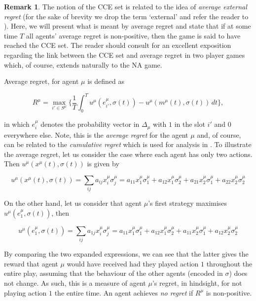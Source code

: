 \documentclass{article}
\theoremstyle{definition}
\newtheorem*{remark}{Remark}
\newcommand{\pure}[2]{e^{#1}_{#2}}
\begin{document}
  \begin{remark}
    The notion of the CCE set is related to the idea of \emph{average external regret} (for the
    sake of brevity we drop the term `external' and refer the reader to \cite{AGT}). Here, we
    will present what is meant by average regret and state that if at some time $T$ all agents'
    average regret is non-positive, then the game is said to have reached the CCE set. The
    reader should consult \cite{PayoffPerformance} for an excellent exposition regarding the
    link between the CCE set and average regret in two player games which, of course, extends
    naturally to the NA game.
    
    Average regret, for agent $\mu$ is defined as

    \begin{equation}
      R^{\mu} = \max_{i' \in S^\mu} \Big\{ \frac{1}{T} \int_{0}^{T} u^{\mu}(\pure{\mu}{i'}, \sigma(t)) - u^{\mu}(m^\mu(t), \sigma(t)) \, dt \Big\},
    \end{equation}
  
    in which $\pure{\mu}{i}$ denotes the probability vector in $\Delta_\mu$ with $1$ in the slot
    $i'$ and $0$ everywhere else. Note, this is the \emph{average regret} for the agent $\mu$
    and, of course, can be related to the \emph{cumulative regret} which is used for analysis
    in \cite{Leonardos and Piliouras, Cesa-Bianchi}.  To illustrate the average regret, let us
    consider the case where each agent has only two actions. Then $u^{\mu}(x^\mu(t), \sigma(t))$
    is given by
    
    \begin{equation}
      u^{\mu}(x^\mu(t), \sigma(t)) = \sum_{ij} a_{ij} x_i^\mu \sigma_j^\mu = a_{11} x_1^\mu \sigma_1^\mu + a_{12} x_1^\mu \sigma_2^\mu + a_{21} x_2^\mu \sigma_1^\mu + a_{22} x_2^\mu \sigma_2^\mu
    \end{equation}
  
    On the other hand, let us consider that agent $\mu$'s first strategy maximises $u^{\mu}(\pure{\mu}{1}, \sigma(t))$, then
  
    \begin{equation}
      u^{\mu}(\pure{\mu}{1}, \sigma(t)) = \sum_{ij} a_{1j} x_i^\mu \sigma_j^\mu = a_{11} x_1^\mu \sigma_1^\mu + a_{12} x_1^\mu \sigma_2^\mu + a_{11} x_2^\mu \sigma_1^\mu + a_{12} x_2^\mu \sigma_2^\mu 
    \end{equation}
  
    By comparing the two expanded expressions, we can see that the latter gives the reward that agent $\mu$ would have received had they played action $1$ throughout the entire play, assuming that the behaviour of the other agents (encoded in $\sigma$) does not change. As such, this is a measure of agent $\mu$'s regret, in hindsight, for not playing action $1$ the entire time. An agent achieves \emph{no regret} if $R^\mu$ is non-positive.
  \end{remark}
\end{document}
